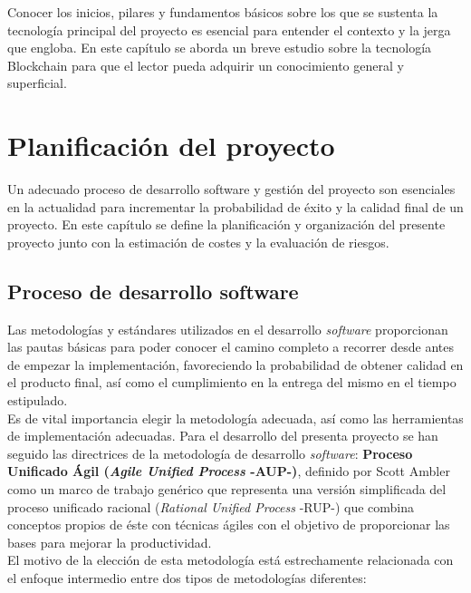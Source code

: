 \documentclass[12pt,a4paper, twoside]{report}
\begin{document}
	Conocer los inicios, pilares y fundamentos básicos sobre los que se sustenta la tecnología principal del proyecto es esencial para entender el contexto y la jerga que engloba. En este capítulo se aborda un breve estudio sobre la tecnología Blockchain para que el lector pueda adquirir un conocimiento general y superficial.
	
	\chapter{Planificación del proyecto} \label{planningChapter}
	
	Un adecuado proceso de desarrollo software y gestión del proyecto son esenciales en la actualidad para incrementar la probabilidad de éxito y la calidad final de un proyecto. En este capítulo se define la planificación y organización del presente proyecto junto con la estimación de costes y la evaluación de riesgos.
	
	\section{Proceso de desarrollo software}

	Las metodologías y estándares utilizados en el desarrollo \textit{software} proporcionan las pautas básicas para poder conocer el camino completo a recorrer desde antes de empezar la implementación, favoreciendo la probabilidad de obtener calidad en el producto final, así como el cumplimiento en la entrega del mismo en el tiempo estipulado. \\
	
	Es de vital importancia elegir la metodología adecuada, así como las herramientas de implementación adecuadas. Para el desarrollo del presenta proyecto se han seguido las directrices de la metodología de desarrollo \textit{software}: \textbf{Proceso Unificado Ágil (\textit{Agile Unified Process} -AUP-)}, definido por Scott Ambler como un marco de trabajo genérico que representa una versión simplificada del proceso unificado racional (\textit{Rational Unified Process} -RUP-) que combina conceptos propios de éste con técnicas ágiles con el objetivo de proporcionar las bases para mejorar la productividad. \\
	
	El motivo de la elección de esta metodología está estrechamente relacionada con el enfoque intermedio entre dos tipos de metodologías diferentes:
	
\end{document}
